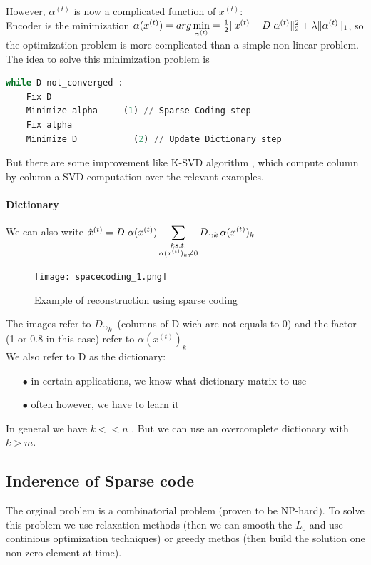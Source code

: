 \documentclass[a4paper,10pt]{article}
\begin{document}
However, $\alpha^{(t)}$ is now a complicated function of $x^{(t)}$:\\
Encoder is the minimization $\alpha(x^{(t)}) = arg\min\limits_{\alpha^{(t)}}= \frac{1}{2} \| x^{(t)} - D \hspace{3px} \alpha^{(t)} \|_2^2 + \lambda \|\alpha^{(t)} \|_1$, so the optimization problem is more complicated than a simple non linear problem.\\
The idea to solve this minimization problem is \cite{NIPS2006_2979}

\begin{lstlisting}[language=Python,frame=single]
while D not_converged :
    Fix D
    Minimize alpha     (1) // Sparse Coding step
    Fix alpha
    Minimize D           (2) // Update Dictionary step
\end{lstlisting}

But there are some improvement like K-SVD algorithm \cite{KSVD}, which compute column by column a SVD computation over the relevant examples.
\paragraph{Dictionary}
We can also write $\hat{x}^{(t)} = D\hspace{3px} \alpha(x^{(t)}) \displaystyle\sum_{\substack{k s.t.\\ \alpha(x^{(t)})_k\neq 0}}  D.,_k \alpha(x^{(t)} )_k$
\begin{figure}[h]
 \centering
 \texttt{[image: spacecoding\_1.png]}
  \caption{Example of reconstruction using sparse coding}
\end{figure}

The images refer to $D.,_k$ (columns of D wich are not equals to 0) and the factor (1 or 0.8 in this case) refer to $\alpha(x^{(t)} )_k$
\\We also refer to D as the dictionary:
\begin{itemize}
 \item[$\bullet$]in certain applications, we know what dictionary matrix to use
 \item[$\bullet$]often however, we have to learn it
\end{itemize}

In general we have $k<<n$ . But we can use an overcomplete dictionary with $k > m$.
\subsection{Inderence of Sparse code}
The orginal problem is a combinatorial problem (proven to be NP-hard). To solve this problem we use relaxation methods (then we can smooth the $L_0$ and use continious optimization techniques) or greedy methos (then build the solution one non-zero element at time).
\end{document}
